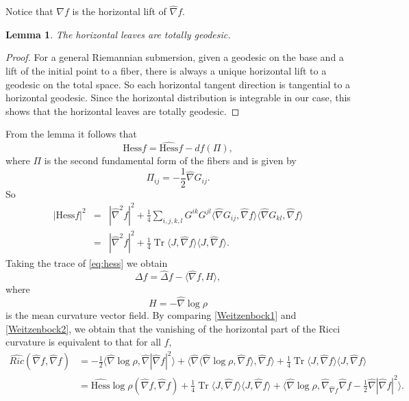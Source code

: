 \documentclass[a4paper,11pt]{amsart}
\newtheorem{lemma}[theorem]{Lemma}
\theoremstyle{definition}
\numberwithin{equation}{section}
\DeclareMathOperator{\Tr}{Tr}
\begin{document}
Notice that $\nabla f$ is the horizontal lift of $\widehat{\nabla}f$. 
\begin{lemma}
The horizontal leaves are totally geodesic.	
\end{lemma}
\begin{proof}
For a general Riemannian submersion, given a geodesic on the base and a lift of the initial point to a fiber, there is always a unique horizontal lift to a geodesic on the total space. So each horizontal tangent direction is tangential to a horizontal geodesic.  Since the horizontal distribution is integrable in our case, this shows that the horizontal leaves are totally geodesic. 
\end{proof}


From the lemma it follows that
\begin{equation}\label{eq:hess}
	\text{Hess} f=\widehat{\text{Hess}}f-df(\Pi), 
\end{equation}
where $\Pi$ is the second fundamental form of the fibers and is given by
\begin{equation}
	\Pi_{ij}=-\frac{1}{2}\widehat{\nabla} G_{ij}.
\end{equation}
So 
\begin{eqnarray*}
	|\text{Hess}f|^2&=&|\widehat{\nabla} ^2f|^2+\frac{1}{4}\sum_{i,j,k,l}G^{ik}G^{jl}\langle\widehat{\nabla} G_{ij}, \widehat{\nabla} f\rangle\langle\widehat{\nabla} G_{kl}, \widehat{\nabla} f\rangle\\&=&|\widehat{\nabla} ^2f|^2+\frac{1}{4}\Tr\langle J, \widehat{\nabla} f\rangle\langle J, \widehat{\nabla} f\rangle.
\end{eqnarray*}
Taking the trace of \eqref{eq:hess} we obtain
\begin{equation}
	\Delta f=\widehat\Delta f-\langle\widehat{\nabla} f, H\rangle,
\end{equation}
where $$H=-\widehat{\nabla} \log\rho$$ is the mean curvature vector field.
By comparing \eqref{Weitzenbock1} and \eqref{Weitzenbock2}, we obtain that the vanishing of the horizontal part of the Ricci curvature is equivalent to that for all $f$,
\begin{align*}
\widehat{Ric}(\widehat{\nabla} f, \widehat{\nabla} f)&=-\frac{1}{2}\langle \widehat{\nabla}\log\rho, \widehat{\nabla}|\widehat{\nabla} f|^2\rangle+\langle\widehat{\nabla}\langle \widehat{\nabla}\log\rho, \widehat{\nabla} f\rangle, \widehat{\nabla} f\rangle+\frac{1}{4}\Tr\langle J, \widehat{\nabla} f\rangle\langle J, \widehat{\nabla} f\rangle
	\\
&=\widehat{\text{Hess}}\log\rho (\widehat{\nabla} f, \widehat{\nabla} f)+\frac{1}{4}\Tr\langle J, \widehat{\nabla} f\rangle\langle J, \widehat{\nabla} f\rangle
	+\langle\widehat{\nabla} \log\rho, \widehat{\nabla}_{\widehat{\nabla} f}\widehat{\nabla} f-\frac{1}{2}\widehat{\nabla}|\widehat{\nabla} f|^2\rangle.
\end{align*}
\end{document}
